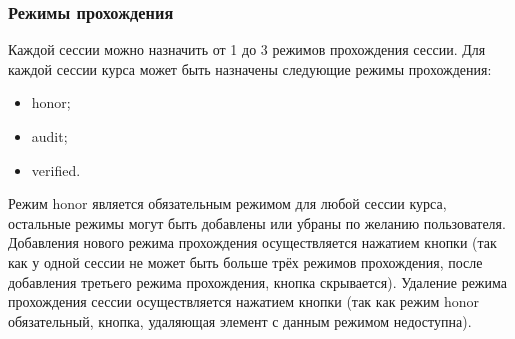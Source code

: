 \subsubsection{Режимы прохождения}
	Каждой сессии можно назначить от 1 до 3 режимов прохождения сессии. Для каждой сессии курса может быть назначены следующие режимы прохождения:
	\begin{itemize}
		\item honor;
		\item audit;
		\item verified.
	\end{itemize}
	Режим honor является обязательным режимом для любой сессии курса, остальные режимы могут быть добавлены или убраны по желанию пользователя. Добавления нового режима прохождения осуществляется нажатием кнопки  (так как у одной сессии не может быть больше трёх режимов прохождения, после добавления третьего режима прохождения, кнопка  скрывается). Удаление режима прохождения сессии осуществляется нажатием кнопки  (так как режим honor обязательный, кнопка, удаляющая элемент с данным режимом недоступна).
	
